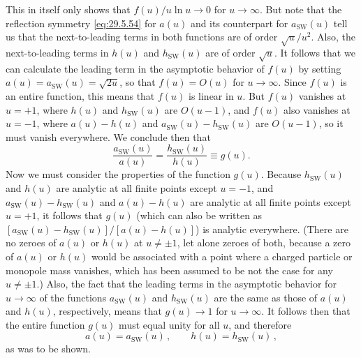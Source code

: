 This in itself only shows that \(f(u)/u\ln u\longrightarrow0\) for
\(u\longrightarrow\infty\). But note that the reflection symmetry
\eqref{eq:29.5.54} for \(a(u)\) and its counterpart for
\(a_{\mathrm{SW}}(u)\) tell us that the next-to-leading terms in both
functions are of order \(\sqrt{u}/u^2\). Also, the next-to-leading terms in
\(h(u)\) and \(h_{\mathrm{SW}}(u)\) are of order \(\sqrt{u}\). It follows
that we can calculate the leading term in the asymptotic behavior of \(f(u)\)
by setting \(a(u)=a_{\mathrm{SW}}(u)=\sqrt{2u}\), so that
\(f(u)=O(u)\) for \(u\longrightarrow\infty\). Since \(f(u)\) is an entire
function, this means that \(f(u)\) is linear in \(u\). But \(f(u)\) vanishes
at \(u=+1\), where \(h(u)\) and \(h_{\mathrm{SW}}(u)\) are \(O(u-1)\), and
\(f(u)\) also vanishes at \(u=-1\), where \(a(u)-h(u)\) and
\(a_{\mathrm{SW}}(u)-h_{\mathrm{SW}}(u)\) are \(O(u-1)\), so it must vanish
everywhere. We conclude then that
\begin{equation}
  \frac{a_{\mathrm{SW}}(u)}{a(u)}
  =\frac{h_{\mathrm{SW}}(u)}{h(u)}
  \equiv g(u).
  \tag{29.5.86}\label{eq:29.5.86}
\end{equation}
Now we must consider the properties of the function \(g(u)\). Because
\(h_{\mathrm{SW}}(u)\) and \(h(u)\) are analytic at all finite points except
\(u=-1\), and \(a_{\mathrm{SW}}(u)-h_{\mathrm{SW}}(u)\) and
\(a(u)-h(u)\) are analytic at all finite points except \(u=+1\), it follows
that \(g(u)\) (which can also be written as
\([a_{\mathrm{SW}}(u)-h_{\mathrm{SW}}(u)]/[a(u)-h(u)]\)) is analytic
everywhere. (There are no zeroes of \(a(u)\) or \(h(u)\) at \(u\ne\pm1\),
let alone zeroes of both, because a zero of \(a(u)\) or \(h(u)\) would be
associated with a point where a charged particle or monopole mass vanishes,
which has been assumed to be not the case for any \(u\ne\pm1\).) Also, the
fact that the leading terms in the asymptotic behavior for
\(u\longrightarrow\infty\) of the functions \(a_{\mathrm{SW}}(u)\) and
\(h_{\mathrm{SW}}(u)\) are the same as those of \(a(u)\) and \(h(u)\),
respectively, means that \(g(u)\longrightarrow1\) for
\(u\longrightarrow\infty\). It follows then that the entire function
\(g(u)\) must equal unity for all \(u\), and therefore
\begin{equation}
  a(u)=a_{\mathrm{SW}}(u)\,,
  \qquad
  h(u)=h_{\mathrm{SW}}(u)\,,
  \tag{29.5.87}\label{eq:29.5.87}
\end{equation}
as was to be shown.
